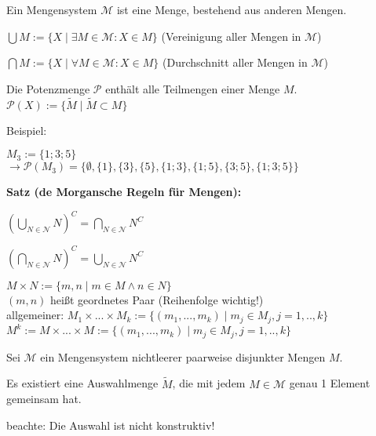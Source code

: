 \begin{mydef}[Mengensystem]
	Ein Mengensystem $\mathcal M$ ist eine Menge, bestehend aus anderen Mengen.
	\begin{compactitem}
		\item $\bigcup M := \{X \mid \exists M \in \mathcal M: X \in M\}$ (Vereinigung aller Mengen in 
		$\mathcal M$)
		\item $\bigcap M := \{X \mid \forall M \in \mathcal M: X \in M\}$ (Durchschnitt aller Mengen in 
		$\mathcal M$)
	\end{compactitem}
\end{mydef}

\begin{mydef}[Potenzmenge]
	Die Potenzmenge $\mathcal P$ enth\"alt alle Teilmengen einer Menge $M$. \\
	$\mathcal P(X) := \{\tilde M \mid \tilde M \subset M\}$ 
\end{mydef}

Beispiel:
\begin{compactitem}
	\item $M_3 := \{1;3;5\}$ \\
	$\to \mathcal P(M_3) = \{\emptyset, \{1\}, \{3\}, \{5\}, \{1;3\}, \{1;5\}, \{3;5\}, \{1;3;5\}\}$
\end{compactitem}

\begin{framed}
	\textbf{Satz (de Morgansche Regeln f\"ur Mengen):}
	\begin{compactitem}
		\item $(\mathop{\bigcup}_{N \in \mathcal N} N)^C = \mathop{\bigcap}_{N \in \mathcal N} N^C$ 
		\item $(\mathop{\bigcap}_{N \in \mathcal N} N)^C = \mathop{\bigcup}_{N \in \mathcal N} N^C$ 
	\end{compactitem}
\end{framed}

\begin{mydef}
	$M \times N := \{m,n \mid m \in M \land n \in N\}$ \\
	$(m,n)$ hei{\ss}t geordnetes Paar (Reihenfolge wichtig!) \\
	allgemeiner: $M_1 \times ... \times M_k := \{(m_1,...,m_k) \mid m_j \in M_j, j=1, .., k\}$ \\
	$M^k := M \times ... \times M := \{(m_1,...,m_k) \mid m_j \in M_j, j=1, .., k\}$ 
\end{mydef}

\begin{satz}[Auswahlaxiom]
	Sei $\mathcal M$ ein Mengensystem nichtleerer paarweise disjunkter Mengen $M$.
	\begin{compactitem}
		\item Es existiert eine Auswahlmenge $\tilde M$, die mit jedem $M \in \mathcal M$ genau 1 Element 				gemeinsam hat.
		\item beachte: Die Auswahl ist nicht konstruktiv!
	\end{compactitem}
\end{satz}